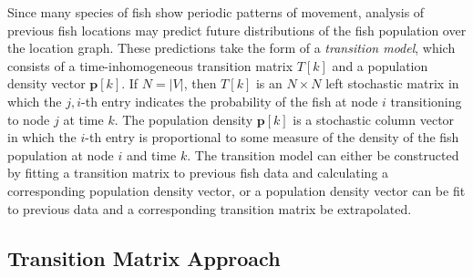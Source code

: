 \documentclass[11pt,letterpaper]{article}
\begin{document}
	Since many species of fish show periodic patterns of movement, analysis of previous fish locations may predict future distributions of the fish population over the location graph. These predictions take the form of a \textit{transition model}, which consists of a time-inhomogeneous transition matrix $T[k]$ and a population density vector $\mathbf p[k]$. If $N = |V|$, then $T[k]$ is an $N\times N$ left stochastic matrix in which the $j, i$-th entry indicates the probability of the fish at node $i$ transitioning to node $j$ at time $k$. The population density $\mathbf p[k]$ is a stochastic column vector in which the $i$-th entry is proportional to some measure of the density of the fish population at node $i$ and time $k$. The transition model can either be constructed by fitting a transition matrix to previous fish data and calculating a corresponding population density vector, or a population density vector can be fit to previous data and a corresponding transition matrix be extrapolated. 
	
	\subsection{Transition Matrix Approach}
	
\end{document}

